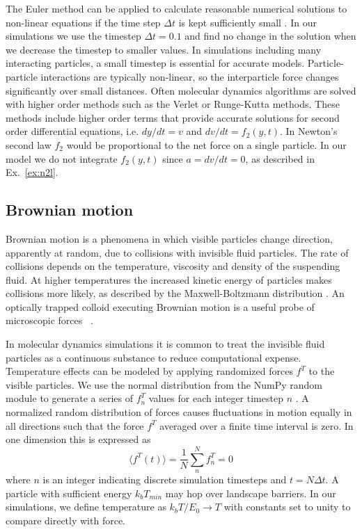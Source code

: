 \documentclass[twocolumn,preprintnumbers,amsmath,amssymb,aps,prb]{revtex4}
\begin{document}
  The Euler method can be applied to
  calculate reasonable numerical solutions to 
  non-linear
  equations if the time step $\Delta t$
  is kept sufficiently small \cite{Newman}.
  In our simulations we use the timestep $\Delta t = 0.1$
  and find no change in the solution
  when we decrease the timestep to smaller values.
  In simulations
  including many interacting particles,
  a small
  timestep is essential for accurate models.
  Particle-particle interactions are typically non-linear,
  so the interparticle force changes significantly over small distances.
  Often molecular dynamics algorithms 
  are solved with higher order methods
  such as the Verlet or Runge-Kutta methods.
  These methods include  higher order terms
  that provide accurate solutions for
  second order differential equations,
  i.e. $dy/dt = v$ and $dv/dt = f_2(y,t)$.
  In Newton's second law $f_2$ would be proportional
  to the net force on a single particle.
  In our model 
  we do not integrate $f_2(y,t)$ since 
  $a = dv/dt = 0$,
  as described in Ex.~\ref{ex:n2l}.
  
  \subsection{Brownian motion}
  \label{ex:brownian}
  Brownian motion is a phenomena in which 
  visible particles change direction,
  apparently at random, 
  due to collisions with invisible fluid particles.
  The rate of collisions depends on the temperature, viscosity
  and density of 
  the suspending fluid.
  At higher temperatures
  the increased kinetic energy of particles
  makes collisions more likely, 
  as described by the Maxwell-Boltzmann distribution \cite{Einstein1905}.
  An optically trapped colloid executing Brownian motion
  is a useful probe of microscopic forces ~\cite{Volpe2013}.
  
  In molecular dynamics simulations
  it is common to treat the 
  invisible fluid particles as a continuous substance
  to reduce computational expense.
  Temperature effects
  can be modeled by applying randomized forces $f^T$
  to the visible particles.
  We use the normal distribution from the NumPy random module
  to generate a series of $f^T_n$ values for
  each integer timestep $n$ \cite{numpy}.
  A normalized random distribution of forces
  causes fluctuations in 
  motion 
  equally in all
  directions such that the force $f^T$
  averaged over a finite time interval
  is zero.  In one dimension this is expressed as 
  \begin{equation}
    \langle f^T(t) \rangle = \frac{1}{N} \sum_n^N f^T_n = 0
  \end{equation}
  where $n$ is an integer indicating
  discrete simulation timesteps and 
  $t = N \Delta t$.
  A particle
  with sufficient energy $k_b T_{min}$ may 
  hop over landscape
  barriers.
  In our simulations,
  we define temperature as 
  $k_b T/E_0 \rightarrow T$
  with constants set to unity
  to
  compare directly with force. 
 
\end{document}

